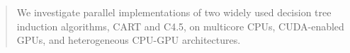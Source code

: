 \begin{abstract}
We investigate parallel implementations of two widely used decision tree
induction algorithms, CART and C4.5, on multicore CPUs, CUDA-enabled GPUs, and
heterogeneous CPU-GPU architectures.

\end{abstract}
